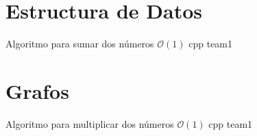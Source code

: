 \section{Estructura de Datos}

{Algoritmo para sumar dos números}
{$\mathcal{O}(1)$}
{cpp}{}
{team1}

\section{Grafos}

{Algoritmo para multiplicar dos números}
{$\mathcal{O}(1)$}
{cpp}{}
{team1}
